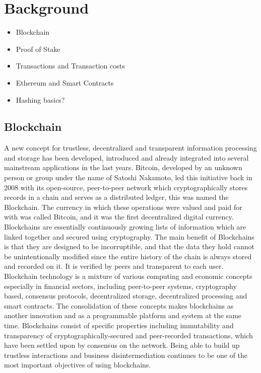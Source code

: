 \section{Background}

\begin{itemize}
\item Blockchain
\item Proof of Stake
\item Transactions and Transaction costs
\item Ethereum and Smart Contracts
\item Hashing basics?
\end{itemize}

\subsection{Blockchain}

A new concept for trustless, decentralized and transparent information processing and storage has been developed, introduced and already integrated into several mainstream applications in the last years. Bitcoin, developed by an unknown person or group under the name of Satoshi Nakamoto, led this initiative back in 2008 with its open-source, peer-to-peer network which cryptographically stores records in a chain and serves as a distributed ledger, this was named the Blockchain. The currency in which these operations were valued and paid for with was called Bitcoin, and it was the first decentralized digital currency.
Blockchains are essentially continuously growing lists of information which are linked together and secured using cryptography. The main benefit of Blockchains is that they are designed to be incorruptible, and that the data they hold cannot be unintentionally modified since the entire history of the chain is always stored and recorded on it. It is verified by peers and transparent to each user.
Blockchain technology is a mixture of various computing and economic concepts especially in financial sectors, including peer-to-peer systems, cryptography based, consensus protocols, decentralized storage, decentralized processing and smart contracts. The consolidation of these concepts makes blockchains as another innovation and as a programmable platform and system at the same time. Blockchains consist of specific properties including immutability and transparency of cryptographically-secured and peer-recorded transactions, which have been settled upon by consensus on the network. Being able to build up trustless interactions and business disintermediation continues to be one of the most important objectives of using blockchains.

